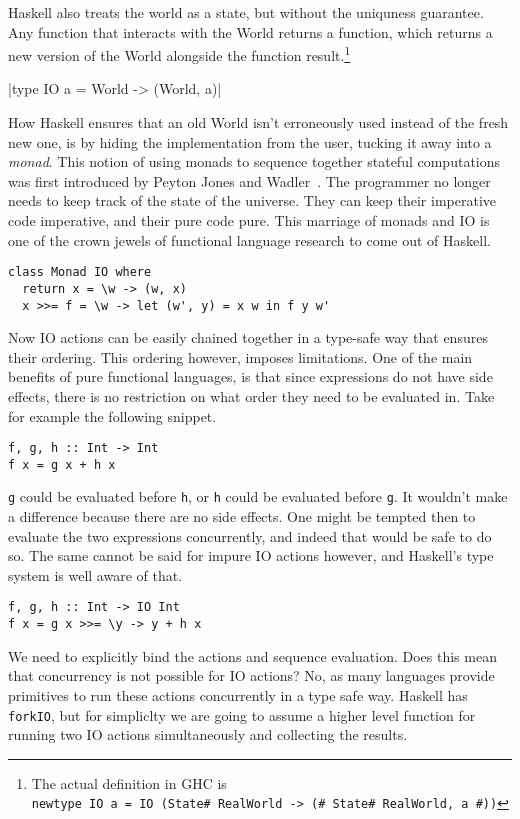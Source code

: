 \documentclass{report}
\begin{document}
Haskell also treats the world as a state, but without the uniquness guarantee.
Any function that interacts with the World returns a function, which returns a
new version of the World alongside the function result.\footnote{The actual
  definition in GHC is \\ \texttt{newtype IO a = IO (State#
    RealWorld -> (# State# RealWorld, a #))}}

|type IO a = World -> (World, a)|

How Haskell ensures that an old World isn't erroneously used instead of the
fresh new one, is by hiding the implementation from the user, tucking it away
into a \textit{monad}. This notion of using monads to sequence together stateful
computations was first introduced by Peyton Jones and
Wadler~\cite{peytonjones1993}\cite{wadler1995}. The programmer no longer needs
to keep track of the state of the universe. They can keep their imperative code imperative,
and their pure code pure. This marriage of monads and IO is one of the crown
jewels of functional language research to come out of Haskell.
\begin{verbatim}
class Monad IO where
  return x = \w -> (w, x)
  x >>= f = \w -> let (w', y) = x w in f y w'
\end{verbatim}

Now IO actions can be easily chained together in a type-safe way that ensures
their ordering.
This ordering however, imposes limitations. One of the main benefits of pure
functional languages, is that since expressions do not have side effects, there
is no restriction on what order they need to be evaluated in.
Take for example the following snippet.
\begin{verbatim}
f, g, h :: Int -> Int
f x = g x + h x
\end{verbatim}

\texttt{g} could be evaluated before \texttt{h}, or \texttt{h} could be
evaluated before \texttt{g}. It wouldn't make a difference because there are no
side effects. One might be tempted then to evaluate the two expressions
concurrently, and indeed that would be safe to do so.  The same cannot be said
for impure IO actions however, and Haskell's type system is well aware of that.
\begin{verbatim}
f, g, h :: Int -> IO Int
f x = g x >>= \y -> y + h x
\end{verbatim}
We need to explicitly bind the actions and sequence evaluation.
Does this mean that concurrency is not possible for IO actions? No, as many
languages provide primitives to run these actions concurrently in a type safe
way. Haskell has \texttt{forkIO}, but for simpliclty we are going
to assume a higher level function for running two IO actions simultaneously and
collecting the results.
\end{document}
